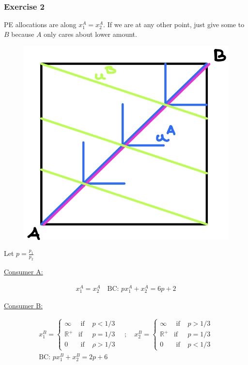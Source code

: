 {
\subsubsection*{Exercise 2}

\begin{enumerate}[label=(\alph*)]
{\item 
PE allocations are along $x_{1}^{A}=x_{2}^{A}$. If we are at any other point, just give some to $B$ because $A$ only cares about lower amount.

\begin{figure}[!ht]
    \centering
    \includegraphics[width=0.75\linewidth]{images/2014_15_2.png}    
\end{figure}
}
{\item 
Let $p=\frac{p_{1}}{p_{2}}$

\underline{Consumer A:}

\begin{align*}
    x_{1}^{A}=x_{2}^{A} \quad\text{BC: } p x_{1}^{A}+x_{2}^{A}=6 p+2
\end{align*}

\underline{Consumer B:}

\begin{align*}
    x_1^B=\left\{\begin{array}{lll}
        \infty & \text { if } & p<1 / 3 \\
        \mathbb{R}^{+} & \text {if } & p=1 / 3 \\
        0 & \text { if } & \rho>1 / 3
    \end{array}\right. 
    \quad ; \quad
    x_2^B=\left\{\begin{array}{lll}
        \infty & \text { if } & p>1 / 3 \\
        \mathbb{R}^{+} & \text {if } & p=1 / 3 \\
        0 & \text { if } & p<1 / 3
    \end{array}\right. \\
    \text{BC: } p x_1^B+x_2^B=2 p+6
\end{align*}

}
\end{enumerate}}
